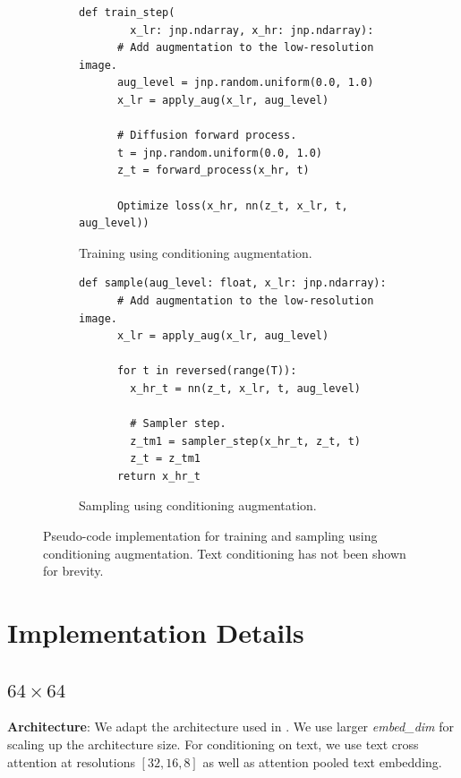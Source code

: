 \begin{figure}
\centering
\begin{subfigure}{.49\textwidth}
  \centering
  \begin{Verbatim}[fontsize=\scriptsize]
    def train_step(
        x_lr: jnp.ndarray, x_hr: jnp.ndarray):
      # Add augmentation to the low-resolution image.
      aug_level = jnp.random.uniform(0.0, 1.0)
      x_lr = apply_aug(x_lr, aug_level)
      
      # Diffusion forward process.
      t = jnp.random.uniform(0.0, 1.0)
      z_t = forward_process(x_hr, t)
      
      Optimize loss(x_hr, nn(z_t, x_lr, t, aug_level))
  \end{Verbatim}
  \caption{Training using conditioning augmentation.}
\end{subfigure}%
\hfill%
\begin{subfigure}{.49\textwidth}
  \centering
    \begin{Verbatim}[fontsize=\scriptsize]
    def sample(aug_level: float, x_lr: jnp.ndarray):
      # Add augmentation to the low-resolution image.
      x_lr = apply_aug(x_lr, aug_level)

      for t in reversed(range(T)):
        x_hr_t = nn(z_t, x_lr, t, aug_level)

        # Sampler step.
        z_tm1 = sampler_step(x_hr_t, z_t, t)
        z_t = z_tm1
      return x_hr_t
  \end{Verbatim}
  \caption{Sampling using conditioning augmentation. }
\end{subfigure}
\caption{Pseudo-code implementation for training and sampling using conditioning augmentation. Text conditioning has not been shown for brevity.}
\label{fig:cond_aug_impl}
\end{figure}


\FloatBarrier
\newpage
\section{Implementation Details}
\label{sec:impl_details_appendix}

\subsection{$64\times64$}
\textbf{Architecture}: We adapt the architecture used in \cite{dhariwal2021diffusion}. We use larger \emph{embed\_dim} for scaling up the architecture size. For conditioning on text, we use text cross attention at resolutions $[32, 16, 8]$ as well as attention pooled text embedding.

